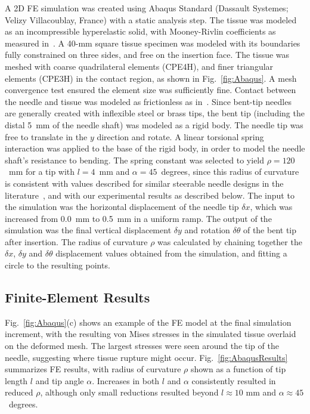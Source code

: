 A 2D FE simulation was created using Abaqus Standard (Dassault Systemes; Velizy Villacoublay, France) with a static analysis step. The tissue was modeled as an incompressible hyperelastic solid, with Mooney-Rivlin coefficients as measured in~\cite{Kim2005}. A 40-mm square tissue specimen was modeled with its boundaries fully constrained on three sides, and free on the insertion face. The tissue was meshed with coarse quadrilateral elements (CPE4H), and finer triangular elements (CPE3H) in the contact region, as shown in Fig.~\ref{fig:Abaqus}. A mesh convergence test ensured the element size was sufficiently fine. Contact between the needle and tissue was modeled as frictionless as in~\cite{Misra2008}. Since bent-tip needles are generally created with inflexible steel or brass tips, the bent tip (including the distal 5~mm of the needle shaft) was modeled as a rigid body. The needle tip was free to translate in the $y$ direction and rotate. A linear torsional spring interaction was applied to the base of the rigid body, in order to model the needle shaft's resistance to bending. The spring constant was selected to yield $\rho = 120$~mm for a tip with $l = 4$~mm and $\alpha = 45$~degrees, since this radius of curvature is consistent with values described for similar steerable needle designs in the literature~\cite{Patil2014}, and with our experimental results as described below. The input to the simulation was the horizontal displacement of the needle tip $\delta x$, which was increased from 0.0~mm to 0.5~mm in a uniform ramp. The output of the simulation was the final vertical displacement $\delta y$ and rotation $\delta\theta$ of the bent tip after insertion. The radius of curvature $\rho$ was calculated by chaining together the $\delta x$, $\delta y$ and $\delta\theta$ displacement values obtained from the simulation, and fitting a circle to the resulting points.

\subsection{Finite-Element Results}
Fig.~\ref{fig:Abaqus}(c) shows an example of the FE model at the final simulation increment, with the resulting von Mises stresses in the simulated tissue overlaid on the deformed mesh. The largest stresses were seen around the tip of the needle, suggesting where tissue rupture might occur. Fig.~\ref{fig:AbaqusResults} summarizes FE results, with radius of curvature $\rho$ shown as a function of tip length $l$ and tip angle $\alpha$. Increases in both $l$ and $\alpha$ consistently resulted in reduced $\rho$, although only small reductions resulted beyond $l \approx 10$ mm and $\alpha \approx 45$~degrees.  

